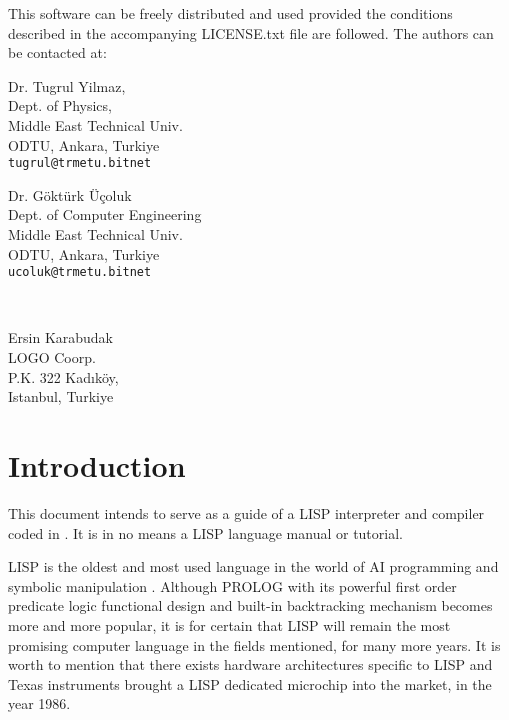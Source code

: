 This software can be freely distributed and used
provided the conditions described in the accompanying LICENSE.txt
file are followed.
\newpage
The authors can be contacted at:
\vspace*{2cm}
\begin{center}
\begin{minipage}[t]{5cm}
\noindent
Dr. Tugrul Yilmaz, \\
Dept. of Physics,  \\
Middle East Technical Univ. \\
ODTU, Ankara, Turkiye \\
{\tt tugrul@trmetu.bitnet}
\end{minipage}
\hspace*{2cm}
\begin{minipage}[t]{6cm}
\noindent
Dr. G\"{o}kt\"{u}rk \"{U}\c{c}oluk \\
Dept. of Computer Engineering \\
Middle East Technical Univ. \\
ODTU, Ankara, Turkiye     \\
{\tt ucoluk@trmetu.bitnet}
\end{minipage} \vspace*{15mm}\\
\begin{minipage}[t]{5cm}
\noindent
Ersin Karabudak \\
LOGO Coorp.\\
P.K. 322 Kad{\i}k\"{o}y, \\
Istanbul, Turkiye
\end{minipage}
\end{center}




\chapter{Introduction}
This  document  intends  to  serve  as  a  guide  of a LISP interpreter and
compiler coded in \C. It is in no means a LISP language manual or tutorial.


LISP  is  the  oldest and most used language in the world of AI programming
and symbolic manipulation . Although PROLOG with its powerful first  order
predicate  logic  functional  design  and  built-in  backtracking mechanism
becomes more and more popular, it is for certain that LISP will remain  the
most  promising  computer  language  in the fields mentioned, for many more
years. It is worth to mention  that  there  exists  hardware  architectures
specific  to  LISP and Texas instruments brought a LISP dedicated microchip
into the market, in the year 1986.

